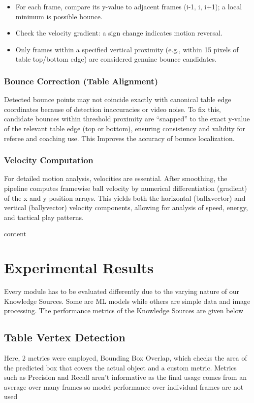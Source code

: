 \documentclass[conference]{IEEEtran}
\begin{document}
\begin{itemize}
    \item For each frame, compare its y-value to adjacent frames (i-1, i, i+1); a local minimum is possible bounce.
    \item Check the velocity gradient: a sign change indicates motion reversal.
    \item Only frames within a specified vertical proximity (e.g., within 15 pixels of table top/bottom edge) are considered genuine bounce candidates.
\end{itemize}

\subsubsection{Bounce Correction (Table Alignment)}
Detected bounce points may not coincide exactly with canonical table edge coordinates because of detection inaccuracies or video noise. To fix this, candidate bounces within threshold proximity are “snapped” to the exact y-value of the relevant table edge (top or bottom), ensuring consistency and validity for referee and coaching use. This Improves the accuracy of bounce localization.

\subsubsection{Velocity Computation}
For detailed motion analysis, velocities are essential. After smoothing, the pipeline computes framewise ball velocity by numerical differentiation (gradient) of the x and y position arrays. This yields both the horizontal (ballxvector) and vertical (ballyvector) velocity components, allowing for analysis of speed, energy, and tactical play patterns.


content
\section{Experimental Results}
Every module has to be evaluated differently due to the varying nature of our Knowledge Sources. Some are ML models while others are simple data and image processing. The performance metrics of the Knowledge Sources are given below

\subsection{Table Vertex Detection}
Here, 2 metrics were employed, Bounding Box Overlap, which checks the area of the predicted box that covers the actual object and a custom metric. Metrics such as Precision and Recall aren't informative as the final usage comes from an average over many frames so model performance over individual frames are not used
\end{document}
